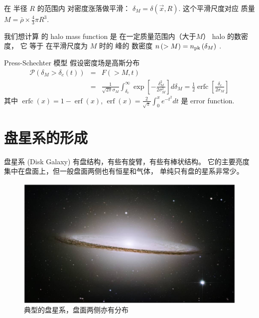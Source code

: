 \documentclass[12pt]{ctexart}
\begin{document}
在 半径 $R$ 的范围内 对密度涨落做平滑： 
$\delta_M = \delta\left(\vec{x},R\right) $. 
这个平滑尺度对应 质量 $M=\bar{\rho} \times \frac{4}{3} \pi R^3$.

我们想计算 的 halo mass function 是 在一定质量范围内（大于$M$） halo 的数密度，
它 等于
在平滑尺度为 $M$ 时的  峰的 数密度
$n\left(>M\right) = n _{\rm{pk}} \left(\delta_M\right)$ .

Press-Schechter 模型
假设密度场是高斯分布
\begin{eqnarray}
    \mathcal{P}\left(\delta_{M}>\delta_{c}(t)\right) &=& F(>M, t) \\ 
    &=& \frac{1}{\sqrt{2 \pi} \sigma_{M}} \int_{\delta_{c}}^{\infty} \exp \left[-\frac{\delta_{M}^{2}}{2 \sigma_{M}^{2}}\right] d \delta_{M}=\frac{1}{2} \operatorname{erfc}\left[\frac{\delta_{c}}{2 \sigma_{M}}\right]
\end{eqnarray}
其中 $\operatorname{erfc}(x)=1-\operatorname{erf}(x)$, $\operatorname{erf}(x)=\frac{2}{\sqrt{\pi}} \int_{0}^{x} e^{-t^{2}} d t$ 是  error function.

\section{盘星系的形成}

盘星系 (Disk Galaxy) 有盘结构，有些有旋臂，有些有棒状结构。
它的主要亮度集中在盘面上，但一般盘面两侧也有恒星和气体，
单纯只有盘的星系非常少。

\begin{figure}[!hbtp]
	\centering 
	\includegraphics[width=1.0\linewidth]{disk_galaxy.png}
	\caption{典型的盘星系，盘面两侧亦有分布}
    \label{fig:disk}
\end{figure}
\end{document}
